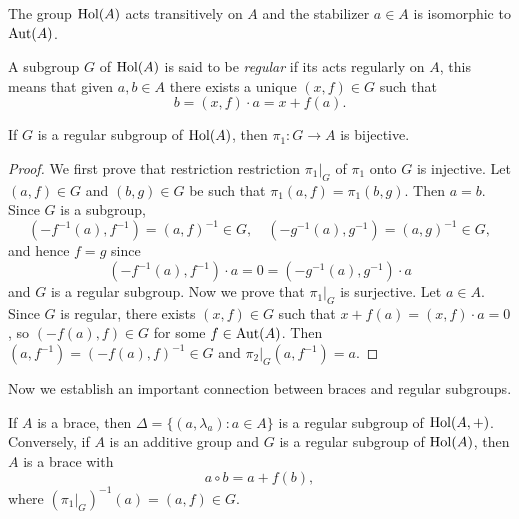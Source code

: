 \begin{exercise}
    The group $\operatorname{Hol}(A)$ acts transitively on $A$ 
	and the stabilizer $a\in A$ 
	is isomorphic to $\operatorname{Aut}(A)$. 
\end{exercise}

A subgroup $G$ of $\operatorname{Hol}(A)$ is said to be \emph{regular} 
if its acts regularly on $A$, this means that 
given $a,b\in A$ there exists a unique $(x,f)\in G$ such that
\[
	b=(x,f)\cdot a=x+f(a).
\]

\begin{lemma}
    \label{lem:bijective}
	If $G$ is a regular subgroup of $\operatorname{Hol}(A)$, then $\pi_1\colon G\to A$ is bijective. 
\end{lemma}

\begin{proof}
	We first prove that restriction restriction $\pi_1|_G$ of $\pi_1$ onto $G$ is injective. Let $(a,f)\in G$ and $(b,g)\in G$
	be such that 
	$\pi_1(a,f)=\pi_1(b,g)$. Then $a=b$. Since $G$ is a
	subgroup, 
	\[
		(-f^{-1}(a),f^{-1})=(a,f)^{-1}\in G,
	    \quad
		(-g^{-1}(a),g^{-1})=(a,g)^{-1}\in G,
	\]
	and hence $f=g$ since
	\[
	(-f^{-1}(a),f^{-1})\cdot a=0=(-g^{-1}(a),g^{-1})\cdot a 
	\]
	and $G$ is a regular subgroup.
	Now we prove that $\pi_1|_G$ is surjective. Let $a\in A$. 
	Since $G$ is regular, there exists $(x,f)\in G$ such that $x+f(a)=(x,f)\cdot a=0$, so $(-f(a),f)\in G$ for some $f\in\operatorname{Aut}(A)$. 
	Then $(a,f^{-1})=(-f(a),f)^{-1}\in G$ and $\pi_2|_G(a,f^{-1})=a$. 
\end{proof}

Now we establish an important connection between braces and regular subgroups. 

\begin{theorem}
\label{thm:regular}
	If $A$ is a brace, then $\Delta=\{(a,\lambda_a):a\in A\}$ is a regular subgroup of 
	$\operatorname{Hol}(A,+)$. Conversely, if $A$ is an additive group and 
	$G$ is a regular subgroup of $\operatorname{Hol}(A)$, then $A$ is 
	a brace with 
	\[
		a\circ b=a+f(b),
	\]
	where $(\pi_1|_G)^{-1}(a)=(a,f)\in G$. 
\end{theorem}


